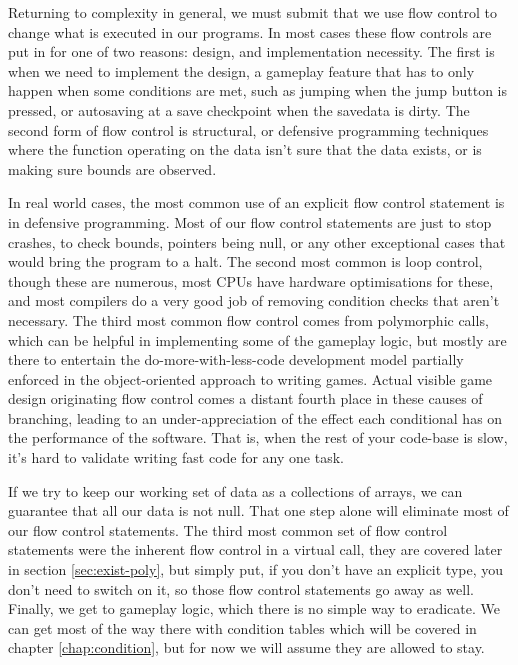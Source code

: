 Returning to complexity in general, we must submit that we use flow control to
change what is executed in our programs. In most cases these flow controls are
put in for one of two reasons: design, and implementation necessity. The first
is when we need to implement the design, a gameplay feature that has to only
happen when some conditions are met, such as jumping when the jump button is
pressed, or autosaving at a save checkpoint when the savedata is dirty. The
second form of flow control is structural, or defensive programming techniques
where the function operating on the data isn't sure that the data exists, or is
making sure bounds are observed.

In real world cases, the most common use of an explicit flow control statement
is in defensive programming. Most of our flow control statements are just to
stop crashes, to check bounds, pointers being null, or any other exceptional
cases that would bring the program to a halt. The second most common is loop
control, though these are numerous, most CPUs have hardware optimisations for
these, and most compilers do a very good job of removing condition checks that
aren't necessary. The third most common flow control comes from polymorphic
calls, which can be helpful in implementing some of the gameplay logic, but
mostly are there to entertain the do-more-with-less-code development model
partially enforced in the object-oriented approach to writing games. Actual
visible game design originating flow control comes a distant fourth place in
these causes of branching, leading to an under-appreciation of the effect each
conditional has on the performance of the software. That is, when the rest of
your code-base is slow, it's hard to validate writing fast code for any one
task.

If we try to keep our working set of data as a collections of arrays, we can
guarantee that all our data is not null. That one step alone will eliminate
most of our flow control statements. The third most common set of flow control
statements were the inherent flow control in a virtual call, they are covered
later in section \ref{sec:exist-poly}, but simply put, if you don't have an
explicit type, you don't need to switch on it, so those flow control statements
go away as well. Finally, we get to gameplay logic, which there is no simple
way to eradicate. We can get most of the way there with condition tables which
will be covered in chapter \ref{chap:condition}, but for now we will assume
they are allowed to stay.

